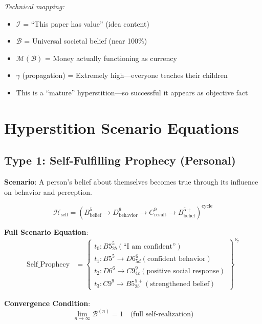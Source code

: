 \documentclass[11pt,twoside]{book}
\newcommand{\noe}[1]{\nu_{#1}}
\newcommand{\Hyperstition}{\mathcal{H}}
\begin{document}
\begin{tcolorbox}[colback=yellow!5!white,colframe=yellow!65!black,title=\textbf{Real-Life Scenarios: Hyperstitions},breakable]
\textit{Technical mapping:}
\begin{itemize}
    \item $\mathcal{I}$ = ``This paper has value'' (idea content)
    \item $\mathcal{B}$ = Universal societal belief (near 100\%)
    \item $\mathcal{M}(\mathcal{B})$ = Money actually functioning as currency
    \item $\gamma$ (propagation) = Extremely high---everyone teaches their children
    \item This is a ``mature'' hyperstition---so successful it appears as objective fact
\end{itemize}

\end{tcolorbox}

\section{Hyperstition Scenario Equations}

\subsection{Type 1: Self-Fulfilling Prophecy (Personal)}

\textbf{Scenario}: A person's belief about themselves becomes true through its
influence on behavior and perception.

\begin{equation}
\boxed{
    \Hyperstition_{\mathrm{self}} = (B_{\mathrm{belief}}^5 \to D_{\mathrm{behavior}}^6
    \to C_{\mathrm{result}}^9 \to B_{\mathrm{belief}}^{5+})^{\mathrm{cycle}}
}
\end{equation}

\textbf{Full Scenario Equation}:
\begin{align}
    \text{Self\_Prophecy} &= \left\{
    \begin{array}{l}
        t_0: B5^5_{2b}(\text{``I am confident''}) \\
        t_1: B5^5 \to D6^6_{5d}(\text{confident behavior}) \\
        t_2: D6^6 \to C9^9_{4c}(\text{positive social response}) \\
        t_3: C9^9 \to B5^{5+}_{2b}(\text{strengthened belief})
    \end{array}
    \right\}^{\noe{7}}
\end{align}

\textbf{Convergence Condition}:
\[
    \lim_{n \to \infty} \mathcal{B}^{(n)} = 1 \quad \text{(full self-realization)}
\]
\end{document}
